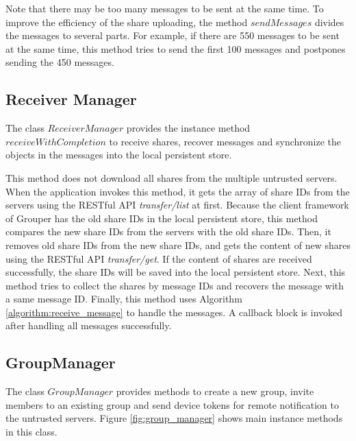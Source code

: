 \documentclass[a4paper,11pt]{report}
\begin{document}
Note that there may be too many messages to be sent at the same time.
To improve the efficiency of the share uploading, the method $sendMessages$ divides the messages to several parts.
For example, if there are 550 messages to be sent at the same time, this method tries to send the first 100 messages and postpones sending the 450 messages.

\subsection{Receiver Manager}

The class $ReceiverManager$ provides the instance method $receiveWithCompletion$ to receive shares, recover messages and synchronize the objects in the messages into the local persistent store.

This method does not download all shares from the multiple untrusted servers.
When the application invokes this method, it gets the array of share IDs from the servers using the RESTful API \emph{transfer/list} at first.
Because the client framework of Grouper has the old share IDs in the local persistent store, this method compares the new  share IDs from the servers with the old share IDs.
Then, it removes old share IDs from the new share IDs, and gets the content of new shares using the RESTful API \emph{transfer/get}.
If the content of shares are received successfully, the share IDs will be saved into the local persistent store.
Next, this method tries to collect the shares by message IDs and recovers the message with a same message ID.
Finally, this method uses Algorithm \ref{algorithm:receive_message} to handle the
messages.
A callback block is invoked after handling all messages successfully.

\subsection{GroupManager}

The class $GroupManager$ provides methods to create a new group, invite members to an existing group and send device tokens for remote notification to the untrusted servers.
Figure \ref{fig:group_manager} shows main instance methods in this class.
\end{document}
